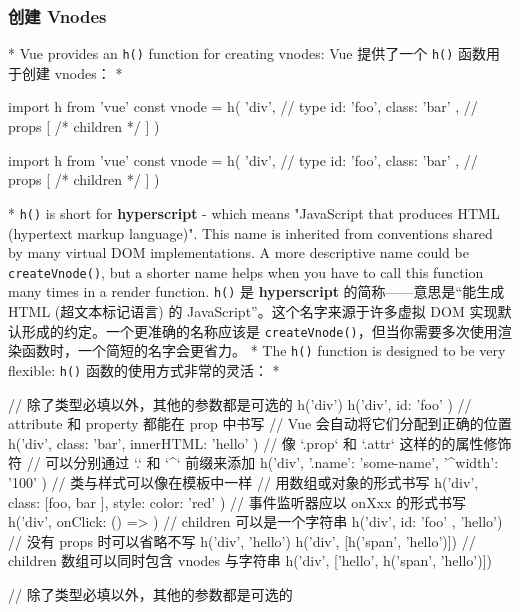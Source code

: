 \begin{paracol}{2}
\subsubsection{创建 Vnodes}
\switchcolumn[0]*%
Vue provides an \texttt{h()} function for creating vnodes:
\switchcolumn
Vue 提供了一个 \texttt{h()} 函数用于创建 vnodes：
\switchcolumn[0]*%
\begin{codeJs}
import { h } from 'vue'
const vnode = h(
  'div', // type
  { id: 'foo', class: 'bar' }, // props
  [
    /* children */
  ]
)
\end{codeJs}
\switchcolumn
\begin{codeJs}
import { h } from 'vue'
const vnode = h(
  'div', // type
  { id: 'foo', class: 'bar' }, // props
  [
    /* children */
  ]
)
\end{codeJs}
\switchcolumn[0]*%
\texttt{h()} is short for \textbf{hyperscript} - which means "JavaScript
that produces HTML (hypertext markup language)". This name is inherited
from conventions shared by many virtual DOM implementations. A more
descriptive name could be \texttt{createVnode()}, but a shorter name
helps when you have to call this function many times in a render
function.
\switchcolumn
\texttt{h()} 是 \textbf{hyperscript} 的简称------意思是``能生成 HTML
(超文本标记语言) 的 JavaScript''。这个名字来源于许多虚拟 DOM
实现默认形成的约定。一个更准确的名称应该是
\texttt{createVnode()}，但当你需要多次使用渲染函数时，一个简短的名字会更省力。
\switchcolumn[0]*%
The \texttt{h()} function is designed to be very flexible:
\switchcolumn
\texttt{h()} 函数的使用方式非常的灵活：
\switchcolumn[0]*%
\begin{codeJs}
// 除了类型必填以外，其他的参数都是可选的
h('div')
h('div', { id: 'foo' })
// attribute 和 property 都能在 prop 中书写
// Vue 会自动将它们分配到正确的位置
h('div', { class: 'bar', innerHTML: 'hello' })
// 像 `.prop` 和 `.attr` 这样的的属性修饰符
// 可以分别通过 `.` 和 `^` 前缀来添加
h('div', { '.name': 'some-name', '^width': '100' })
// 类与样式可以像在模板中一样
// 用数组或对象的形式书写
h('div', { class: [foo, { bar }], style: { color: 'red' } })
// 事件监听器应以 onXxx 的形式书写
h('div', { onClick: () => {} })
// children 可以是一个字符串
h('div', { id: 'foo' }, 'hello')
// 没有 props 时可以省略不写
h('div', 'hello')
h('div', [h('span', 'hello')])
// children 数组可以同时包含 vnodes 与字符串
h('div', ['hello', h('span', 'hello')])
\end{codeJs}
\switchcolumn
\begin{codeJs}
// 除了类型必填以外，其他的参数都是可选的

\end{codeJs}
\end{paracol}

